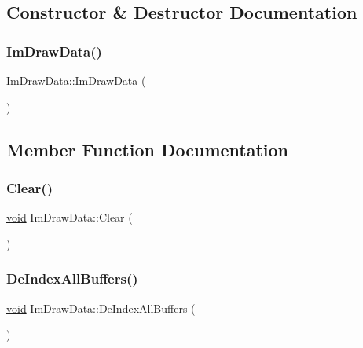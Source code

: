 \subsection{Constructor \& Destructor Documentation}
\mbox{\label{structImDrawData_a96b50c40107c997e9eea7ac3ba1a6138}} 
\subsubsection{\texorpdfstring{Im\+Draw\+Data()}{ImDrawData()}}
{\footnotesize\ttfamily Im\+Draw\+Data\+::\+Im\+Draw\+Data (\begin{DoxyParamCaption}{ }\end{DoxyParamCaption})\hspace{0.3cm}{\ttfamily [inline]}}



\subsection{Member Function Documentation}
\mbox{\label{structImDrawData_ab6a90612bd22eaff0d42539875e2e5c9}} 
\subsubsection{\texorpdfstring{Clear()}{Clear()}}
{\footnotesize\ttfamily \hyperlink{imgui__impl__opengl3__loader_8h_ac668e7cffd9e2e9cfee428b9b2f34fa7}{void} Im\+Draw\+Data\+::\+Clear (\begin{DoxyParamCaption}{ }\end{DoxyParamCaption})\hspace{0.3cm}{\ttfamily [inline]}}

\mbox{\label{structImDrawData_a88ae746e958b79ee527fe94dee29d57c}} 
\subsubsection{\texorpdfstring{De\+Index\+All\+Buffers()}{DeIndexAllBuffers()}}
{\footnotesize\ttfamily \hyperlink{imgui__impl__opengl3__loader_8h_ac668e7cffd9e2e9cfee428b9b2f34fa7}{void} Im\+Draw\+Data\+::\+De\+Index\+All\+Buffers (\begin{DoxyParamCaption}{ }\end{DoxyParamCaption})}

